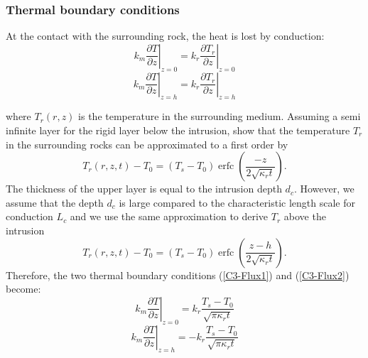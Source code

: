 \subsubsection{Thermal boundary conditions}
\label{C3-sec:thermal-boundary-condition}

At  the  contact with  the  surrounding  rock,  the  heat is  lost  by
conduction:
\begin{equation}
  k_m\left.\frac{\partial                                    T}{\partial
      z}\right|_{z=0}=k_r\left.\frac{\partial              T_r}{\partial
      z}\right|_{z=0}
  \label{C3-Flux1}
\end{equation}
\begin{equation}
  k_m\left.\frac{\partial                                  T}{\partial
      z}\right|_{z=h}=k_r\left.\frac{\partial            T_r}{\partial
      z}\right|_{z=h}
  \label{C3-Flux2}
\end{equation}

where  $T_r(r,z)$  is  the  temperature  in  the  surrounding  medium.
Assuming  a  semi  infinite  layer  for  the  rigid  layer  below  the
intrusion, \citet{Carslaw:1959wf}  show that the temperature  $T_r$ in
the surrounding rocks can be approximated to a first order by
\begin{equation}
  T_r(r,z,t)-T_0=(T_{s}-T_0)\operatorname{erfc}{\left(\frac{-z}{2\sqrt{\kappa_r t}}\right)}.
  \label{eq22}
\end{equation}
The  thickness of  the upper  layer is  equal to  the intrusion  depth
$d_c$. However,  we assume that the  depth $d_c$ is large  compared to
the characteristic  length scale for  conduction $L_c$ and we  use the
same approximation to derive $T_r$ above the intrusion
\begin{equation}
  T_r(r,z,t)-T_0=(T_{s}-T_0)\operatorname{erfc}{\left(\frac{z-h}{2\sqrt{\kappa_r t}}\right)}.
  \label{eq11}
\end{equation}
Therefore,  the  two  thermal boundary  conditions  (\ref{C3-Flux1})  and
(\ref{C3-Flux2}) become:
\begin{equation}
  k_m\left.\frac{\partial                                    T}{\partial
      z}\right|_{z=0}= k_r
  \frac{T_{s}-T_{0}}{\sqrt{\pi \kappa_r t}}
  \label{C3-Flux_1}
\end{equation}
\begin{equation}
  k_m\left.\frac{\partial                                    T}{\partial
      z}\right|_{z=h}= -k_r
  \frac{T_{s}-T_{0}}{\sqrt{\pi \kappa_r t}}
  \label{C3-Flux_2}
\end{equation}


